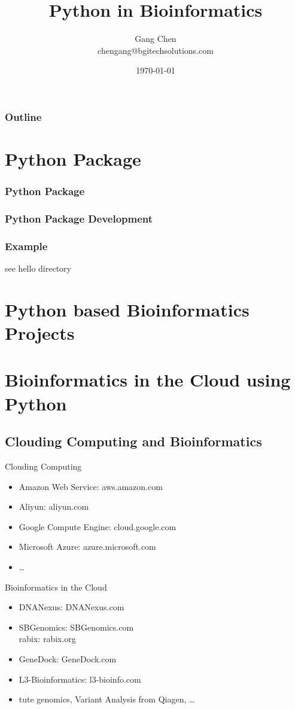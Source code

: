 \documentclass[UTF8]{beamer}
\title{Python in Bioinformatics}
\author{Gang Chen\\ chengang@bgitechsolutions.com}
\date{\today}
\begin{document}
\begin{frame}
\titlepage
\end{frame}

\begin{frame}[t]\frametitle{Outline}
\tableofcontents[hideallsubsections]
\end{frame}

\section{Python Package}
\begin{frame}
  \frametitle{Python Package}
\end{frame}

\begin{frame}
  \frametitle{Python Package Development}
\end{frame}

\begin{frame}
  \frametitle{Example}
  see hello directory
\end{frame}

\section{Python based Bioinformatics Projects}

\section{Bioinformatics in the Cloud using Python}

\subsection{Clouding Computing and Bioinformatics}

\begin{frame}{Clouding Computing}
  \begin{itemize}
    \item Amazon Web Service: aws.amazon.com
    \item Aliyun: aliyun.com
    \item Google Compute Engine: cloud.google.com
    \item Microsoft Azure: azure.microsoft.com
    \item \ldots
  \end{itemize}
\end{frame}

\begin{frame}{Bioinformatics in the Cloud}
  \begin{itemize}
    \item DNANexus: DNANexus.com
    \item SBGenomics: SBGenomics.com\\
      rabix: rabix.org
    \item GeneDock: GeneDock.com
    \item L3-Bioinformatics: l3-bioinfo.com
    \item tute genomics, Variant Analysis from Qiagen, \ldots
  \end{itemize}
\end{frame}
\end{document}
